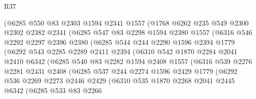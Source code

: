 \begin{lexlean}{R37}
\begin{coremodule}
            (@6285
              @550
              @83
              @2303
              @1594
              @2341
              @1557
              (@1768
                @6262
                @235
                @549
                @2300
                @2302
                @2382
                @2341
                (@6285
                  @547
                  @83
                  @2298
                  @1594
                  @2380
                  @1557
                  (@6316
                    @546
                    @2292
                    @2297
                    @2396
                    @2380
                    (@6285
                      @544
                      @244
                      @2290
                      @1596
                      @2394
                      @1779
                      (@6292
                        @543
                        @2285
                        @2289
                        @2411
                        @2394
                        (@6310
                          @542
                          @1870
                          @2284
                          @2041
                          @2410
                          @6342
                          (@6285
                            @540
                            @83
                            @2282
                            @1594
                            @2408
                            @1557
                            (@6316
                              @539
                              @2276
                              @2281
                              @2431
                              @2408
                              (@6285
                                @537
                                @244
                                @2274
                                @1596
                                @2429
                                @1779
                                (@6292
                                  @536
                                  @2269
                                  @2273
                                  @2446
                                  @2429
                                  (@6310
                                    @535
                                    @1870
                                    @2268
                                    @2041
                                    @2445
                                    @6342
                                    (@6285
                                      @533
                                      @83
                                      @2266

\end{coremodule}
\end{lexlean}
